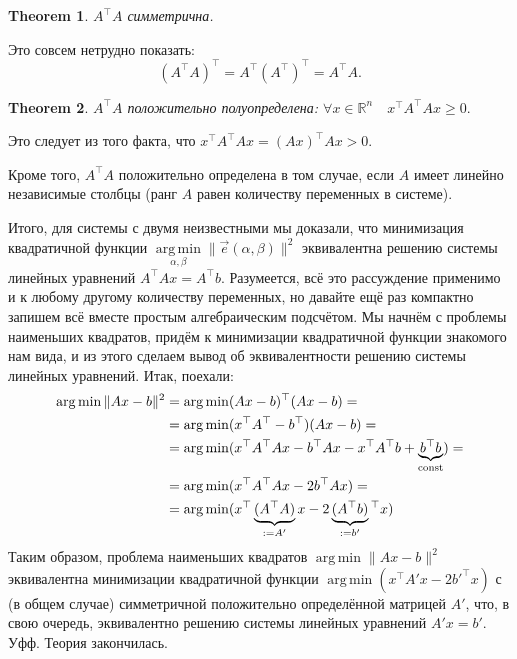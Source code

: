 \documentclass[notitlepage]{report}
\DeclareMathOperator*{\argmin}{arg\,min}
\newtheorem{theorem}{Theorem}
\begin{document}
\begin{theorem}
$A^\top A$ симметрична.
\end{theorem}
Это совсем нетрудно показать:
$$
(A^\top A)^\top = A^\top (A^\top)^\top = A^\top A.
$$

\begin{theorem}
	$A^\top A$ положительно полуопределена: $\forall x\in \mathbb R^n\quad x^\top A^\top A x \geq 0.$
\end{theorem}
Это следует из того факта, что $x^\top A^\top A x = (A x)^\top A x > 0$.

Кроме того, $A^\top A$ положительно определена в том случае, если $A$ имеет линейно независимые столбцы (ранг $A$ равен количеству переменных в системе).

\vspace{5mm}

Итого, для системы с двумя неизвестными мы доказали, что минимизация 
квадратичной функции $\argmin\limits_{\alpha, \beta} \|\vec{e}(\alpha, \beta)\|^2$ эквивалентна решению системы линейных уравнений $A^\top A x = A^\top b$. Разумеется, всё это рассуждение применимо и к любому другому количеству переменных, но давайте ещё раз компактно запишем всё вместе простым алгебраическим подсчётом.
Мы начнём с проблемы наименьших квадратов, придём к минимизации квадратичной функции знакомого нам вида,
и из этого сделаем вывод об эквивалентности решению системы линейных уравнений. Итак, поехали:
\begin{align*}
\argmin \| Ax - b \|^2 &= \argmin (Ax-b)^\top (Ax-b) =\\
& = \argmin(x^\top A^\top - b^\top)(Ax-b) = \\
& = \argmin(x^\top A^\top A x - b^\top Ax - x^\top A^\top b + \underbrace{b^\top b}_{\rm const})=\\
& = \argmin(x^\top A^\top A x - 2b^\top Ax) = \\
& = \argmin(x^\top \underbrace{(A^\top A)}_{:=A'} x - 2\underbrace{(A^\top b)}_{:=b'}\phantom{}^\top x)
\end{align*}
Таким образом, проблема наименьших квадратов $\argmin \| Ax - b \|^2$  эквивалентна минимизации квадратичной функции $\argmin (x^\top A' x - 2b'^\top x)$ с (в общем случае) симметричной положительно определённой матрицей $A'$, что, в свою очередь, эквивалентно решению системы линейных уравнений $A'x = b'$. Уфф. Теория закончилась.


\end{document}
